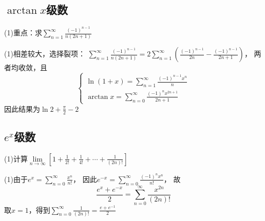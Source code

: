 \subsection{$\arctan x$级数}

\begin{exercise}[$\arctan x$]
  (1)重点：求$\sum\limits_{n = 1}^{\infty} \frac{(-1)^{n-1}}{n(2n+1)}$
\end{exercise}

\begin{solution}
  (1)相差较大，选择裂项：
  $\sum\limits_{n = 1}^{\infty}\frac{(-1)^{n-1}}{n(2n+1)} = 2 \sum\limits_{n = 1}^{\infty} \left( \frac{(-1)^{n-1}}{2n} - \frac{(-1)^{n-1}}{2n+1} \right)$，
  两者均收敛，且
  \begin{equation*}
    \begin{cases}
      \ln(1 + x) = \sum\limits_{n = 1}^{\infty} \frac{(-1)^{n-1}x^n}{n}\\
      \arctan x = \sum\limits_{n = 0}^{\infty} \frac{(-1)^nx^{2n+1}}{2n+1}
    \end{cases}
  \end{equation*}
  因此结果为$\ln 2 + \frac{\pi}{2} - 2$
\end{solution}

\subsection{$e^x$级数}

\begin{exercise}[$e^x$]
  (1)计算$\lim \limits _{n \rightarrow \infty} \left[ 1 + \frac{1}{2!} + \frac{1}{4!} + \cdots + \frac{1}{(2n)!} \right]$
\end{exercise}

\begin{solution}
  (1)由于$e^x = \sum\limits_{n = 0}^{\infty}\frac{x^n}{n!}$，
  因此$e^{-x} = \sum\limits_{n = 0}^{\infty} \frac{(-1)^n x^n}{n!}$，
  故
  \begin{equation*}
    \frac{e^x + e^{-x}}{2} = \sum\limits_{n = 0}^{\infty}\frac{x^{2n}}{(2n)!}
  \end{equation*}
  取$x = 1$，得到$\sum\limits_{n = 0}^{\infty} \frac{1}{(2n)!} = \frac{e + e^{-1}}{2}$
\end{solution}


